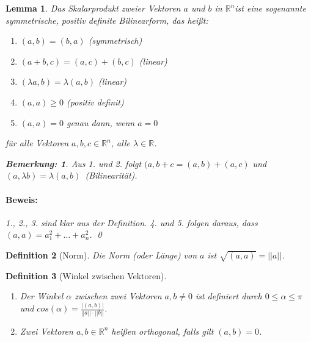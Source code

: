 \documentclass{report}
\newcommand{\lb}{\lambda}
\newcommand{\R}{\mathbb{R}}
\newcommand{\Rn}{\mathbb{R}^n}
\newcommand{\mRn}{\(\mathbb{R}^n\)}
\newcommand{\al}{\alpha}
\theoremstyle{customrem}
\newtheorem*{bemerkung}{Bemerkung\textnormal:}
\theoremstyle{customdef}
\newtheorem{definition}{Definition}[chapter]
\newtheorem{lemma}[definition]{Lemma}
\renewenvironment{proof}{\paragraph{Beweis: }}{\qed}
\theoremstyle{customenv}
\begin{document}
	\begin{lemma}
		Das Skalarprodukt zweier Vektoren \(a\) und \(b\) in \mRn ist eine sogenannte symmetrische, positiv definite Bilinearform, das heißt:
		\begin{enumerate}
			\item \((a, b) = (b, a)\) (symmetrisch)
			\item \((a + b, c) = (a, c) + (b, c)\) (linear)
			\item \((\lb a, b) = \lb(a, b)\) (linear)
			\item \((a, a) \ge 0\) (positiv definit)
			\item \((a, a) = 0\) genau dann, wenn \(a=0\)
		\end{enumerate}
		für alle Vektoren \(a, b, c \in \Rn\), alle \(\lb \in \R\).\\
		\begin{bemerkung}
			Aus 1. und 2. folgt \((a, b+c = (a,b) + (a,c)\) und \((a, \lb b) = \lb (a, b)\)\ (Bilinearität).\\
		\end{bemerkung}

		\begin{proof}
			1., 2., 3. sind klar aus der Definition. 4. und 5. folgen daraus, dass \((a, a) = a_1^2 + \ldots + a_n^2\).
		\end{proof}
	\end{lemma}
	\vspace{.2cm}
	\begin{definition}[Norm]
		Die Norm (oder Länge) von \(a\) ist \(\sqrt{(a, a)} = ||a||\).
	\end{definition}

	\begin{definition}[Winkel zwischen Vektoren]\( \)\vspace{-.5cm}
		\begin{enumerate}
			\item Der Winkel \(\al\) zwischen zwei Vektoren \(a, b \neq 0\) ist definiert durch \(0 \le \al \le \pi\) und \(cos(\al) = \frac{|(a,b)|}{||a||\cdot ||b||}\).
			\item Zwei Vektoren \(a, b \in \R^n\) heißen orthogonal, falls gilt \((a, b) = 0\).
		\end{enumerate}
	\end{definition}
\end{document}
